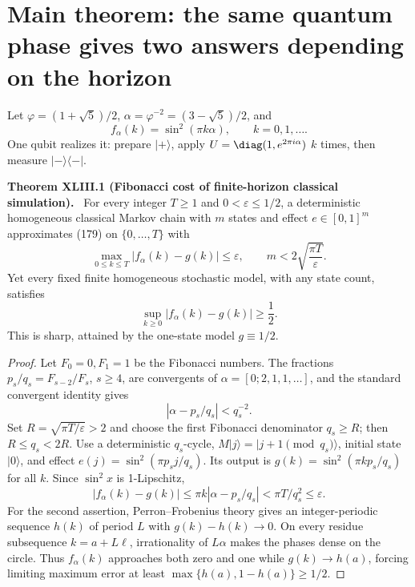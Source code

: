 \documentclass[11pt,a4paper,oneside]{book}
\newcommand{\statement}[3]{\par\medskip\noindent\textbf{#1 #2 (#3).}\ }
\begin{document}
\section{Main theorem: the same quantum phase gives two answers depending on the horizon}
Let $\varphi=(1+\sqrt5)/2$, $\alpha=\varphi^{-2}=(3-\sqrt5)/2$, and
\begin{equation}f_\alpha(k)=\sin^2(\pi k\alpha),\qquad k=0,1,\ldots.\tag{179}\end{equation}
One qubit realizes it: prepare $|+\rangle$, apply $U=\diag(1,e^{2\pi i\alpha})$ $k$ times, then measure $|-\rangle\langle-|$.
\statement{Theorem}{XLIII.1}{Fibonacci cost of finite-horizon classical simulation}
For every integer $T\ge1$ and $0<\varepsilon\le1/2$, a deterministic homogeneous classical Markov chain with $m$ states and effect $e\in[0,1]^m$ approximates (179) on $\{0,\ldots,T\}$ with
\begin{equation}\max_{0\le k\le T}|f_\alpha(k)-g(k)|\le\varepsilon,\qquad m<2\sqrt{\frac{\pi T}{\varepsilon}}.\tag{180}\end{equation}
Yet every fixed finite homogeneous stochastic model, with any state count, satisfies
\begin{equation}\sup_{k\ge0}|f_\alpha(k)-g(k)|\ge\frac12.\tag{181}\end{equation}
This is sharp, attained by the one-state model $g\equiv1/2$.
\begin{proof}
Let $F_0=0,F_1=1$ be the Fibonacci numbers. The fractions $p_s/q_s=F_{s-2}/F_s$, $s\ge4$, are convergents of $\alpha=[0;2,1,1,\ldots]$, and the standard convergent identity gives
\begin{equation}|\alpha-p_s/q_s|<q_s^{-2}.\tag{182}\end{equation}
Set $R=\sqrt{\pi T/\varepsilon}>2$ and choose the first Fibonacci denominator $q_s\ge R$; then $R\le q_s<2R$. Use a deterministic $q_s$-cycle, $M|j\rangle=|j+1\pmod{q_s}\rangle$, initial state $|0\rangle$, and effect $e(j)=\sin^2(\pi p_sj/q_s)$. Its output is $g(k)=\sin^2(\pi kp_s/q_s)$ for all $k$. Since $\sin^2x$ is 1-Lipschitz,
\[|f_\alpha(k)-g(k)|\le\pi k|\alpha-p_s/q_s|<\pi T/q_s^2\le\varepsilon.\]
For the second assertion, Perron--Frobenius theory gives an integer-periodic sequence $h(k)$ of period $L$ with $g(k)-h(k)\to0$. On every residue subsequence $k=a+L\ell$, irrationality of $L\alpha$ makes the phases dense on the circle. Thus $f_\alpha(k)$ approaches both zero and one while $g(k)\to h(a)$, forcing limiting maximum error at least $\max\{h(a),1-h(a)\}\ge1/2$.
\end{proof}
\end{document}

